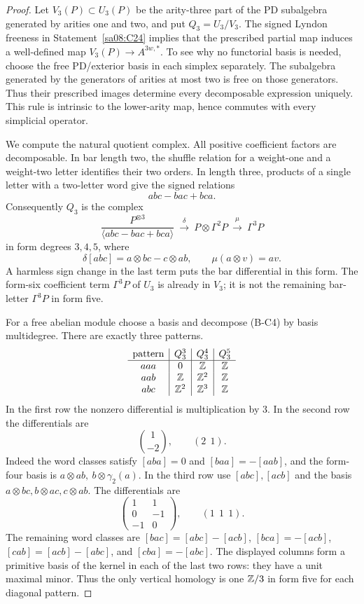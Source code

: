 \begin{proof}
Let $V_3(P)\subset U_3(P)$ be the arity-three
part of the PD subalgebra generated by arities
one and two, and put $Q_3=U_3/V_3$.
The signed Lyndon freeness in
Statement~\ref{sa08:C24} implies that the
prescribed partial map induces a well-defined
map $V_3(P)\to A^{3w,*}$. To see why no
functorial basis is needed, choose the free
PD/exterior basis in each simplex separately.
The subalgebra generated by the generators
of arities at most two is free on those
generators. Thus their prescribed images
determine every decomposable expression
uniquely. This rule is intrinsic to the
lower-arity map, hence commutes with every
simplicial operator.

We compute the natural quotient complex.
All positive coefficient factors are
decomposable. In bar length two, the
shuffle relation for a weight-one and a
weight-two letter identifies their two
orders. In length three, products of a
single letter with a two-letter word
give the signed relations
\[
 abc-bac+bca.
\]
Consequently $Q_3$ is the complex
\begin{equation}
 \frac{P^{\otimes3}}
 {\langle abc-bac+bca\rangle}
 \ \xrightarrow{\delta}\
 P\otimes\Gamma^2P
 \ \xrightarrow{\mu}\
 \Gamma^3P
 \tag{B-C4}
\end{equation}
in form degrees $3,4,5$, where
\[
 \delta[abc]=a\otimes bc-c\otimes ab,
 \qquad \mu(a\otimes v)=av.
\]
A harmless sign change in the last term
puts the bar differential in this form.
The form-six coefficient term
$\Gamma^3P$ of $U_3$ is already in $V_3$;
it is not the remaining bar-letter
$\Gamma^3P$ in form five.

For a free abelian module choose a basis
and decompose (B-C4) by basis multidegree.
There are exactly three patterns.
\[
\begin{array}{c|c|c|c}
\text{pattern}&Q_3^3&Q_3^4&Q_3^5\\ \hline
aaa&0&\mathbb Z&\mathbb Z\\
aab&\mathbb Z&\mathbb Z^2&\mathbb Z\\
abc&\mathbb Z^2&\mathbb Z^3&\mathbb Z
\end{array}
\]
In the first row the nonzero differential
is multiplication by $3$.
In the second row the differentials are
\[
 \binom{1}{-2},\qquad (2\ \ 1).
\]
Indeed the word classes satisfy
$[aba]=0$ and $[baa]=-[aab]$, and
the form-four basis is
$a\otimes ab,\ b\otimes\gamma_2(a)$.
In the third row use $[abc],[acb]$
and the basis
$a\otimes bc,b\otimes ac,c\otimes ab$.
The differentials are
\[
 \begin{pmatrix}1&1\\0&-1\\-1&0\end{pmatrix},
 \qquad (1\ \ 1\ \ 1).
\]
The remaining word classes are
$[bac]=[abc]-[acb]$,
$[bca]=-[acb]$,
$[cab]=[acb]-[abc]$, and
$[cba]=-[abc]$.
The displayed columns form a primitive
basis of the kernel in each of the
last two rows: they have a unit maximal
minor. Thus the only vertical homology
is one $\mathbb Z/3$ in form five for each
diagonal pattern.


\end{proof}
